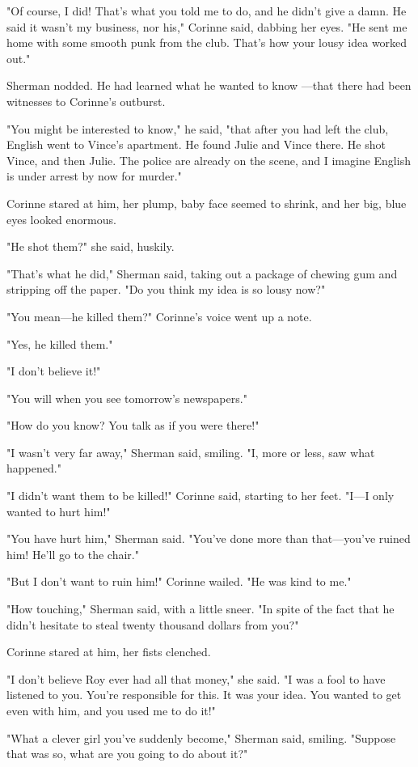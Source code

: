 \documentclass{novel}
\begin{document}
"Of course, I did! That's what you told me to do, and he didn't give a damn. He said it wasn't my business, nor his," Corinne said, dabbing her eyes. "He sent me home with some smooth punk from the club. That's how your lousy idea worked out."

Sherman nodded. He had learned what he wanted to know —that there had been witnesses to Corinne's outburst.

"You might be interested to know," he said, "that after you had left the club, English went to Vince's apartment. He found Julie and Vince there. He shot Vince, and then Julie. The police are already on the scene, and I imagine English is under arrest by now for murder."

Corinne stared at him, her plump, baby face seemed to shrink, and her big, blue eyes looked enormous.

"He shot them?" she said, huskily.

"That's what he did," Sherman said, taking out a package of chewing gum and stripping off the paper. "Do you think my idea is so lousy now?"

"You mean—he killed them?" Corinne's voice went up a note.

"Yes, he killed them."

"I don't believe it!"

"You will when you see tomorrow's newspapers."

"How do you know? You talk as if you were there!"

"I wasn't very far away," Sherman said, smiling. "I, more or less, saw what happened."

"I didn't want them to be killed!" Corinne said, starting to her feet. "I—I only wanted to hurt him!"

"You have hurt him," Sherman said. "You've done more than that—you've ruined him! He'll go to the chair."

"But I don't want to ruin him!" Corinne wailed. "He was kind to me."

"How touching," Sherman said, with a little sneer. "In spite of the fact that he didn't hesitate to steal twenty thousand dollars from you?"

Corinne stared at him, her fists clenched.

"I don't believe Roy ever had all that money," she said. "I was a fool to have listened to you. You're responsible for this. It was your idea. You wanted to get even with him, and you used me to do it!"

"What a clever girl you've suddenly become," Sherman said, smiling. "Suppose that was so, what are you going to do about it?"
\end{document}
